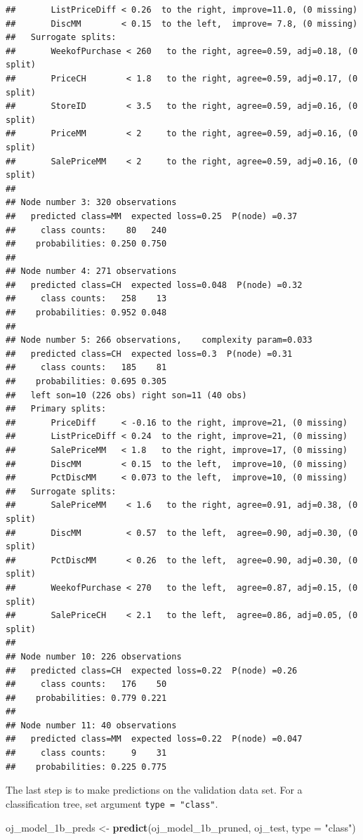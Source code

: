 \documentclass[
]{book}
\newenvironment{Shaded}{\begin{snugshade}}{\end{snugshade}}
\newcommand{\DataTypeTok}[1]{\textcolor[rgb]{0.13,0.29,0.53}{#1}}
\newcommand{\KeywordTok}[1]{\textcolor[rgb]{0.13,0.29,0.53}{\textbf{#1}}}
\newcommand{\NormalTok}[1]{#1}
\newcommand{\StringTok}[1]{\textcolor[rgb]{0.31,0.60,0.02}{#1}}
\begin{document}
\begin{verbatim}
##       ListPriceDiff < 0.26  to the right, improve=11.0, (0 missing)
##       DiscMM        < 0.15  to the left,  improve= 7.8, (0 missing)
##   Surrogate splits:
##       WeekofPurchase < 260   to the right, agree=0.59, adj=0.18, (0 split)
##       PriceCH        < 1.8   to the right, agree=0.59, adj=0.17, (0 split)
##       StoreID        < 3.5   to the right, agree=0.59, adj=0.16, (0 split)
##       PriceMM        < 2     to the right, agree=0.59, adj=0.16, (0 split)
##       SalePriceMM    < 2     to the right, agree=0.59, adj=0.16, (0 split)
## 
## Node number 3: 320 observations
##   predicted class=MM  expected loss=0.25  P(node) =0.37
##     class counts:    80   240
##    probabilities: 0.250 0.750 
## 
## Node number 4: 271 observations
##   predicted class=CH  expected loss=0.048  P(node) =0.32
##     class counts:   258    13
##    probabilities: 0.952 0.048 
## 
## Node number 5: 266 observations,    complexity param=0.033
##   predicted class=CH  expected loss=0.3  P(node) =0.31
##     class counts:   185    81
##    probabilities: 0.695 0.305 
##   left son=10 (226 obs) right son=11 (40 obs)
##   Primary splits:
##       PriceDiff     < -0.16 to the right, improve=21, (0 missing)
##       ListPriceDiff < 0.24  to the right, improve=21, (0 missing)
##       SalePriceMM   < 1.8   to the right, improve=17, (0 missing)
##       DiscMM        < 0.15  to the left,  improve=10, (0 missing)
##       PctDiscMM     < 0.073 to the left,  improve=10, (0 missing)
##   Surrogate splits:
##       SalePriceMM    < 1.6   to the right, agree=0.91, adj=0.38, (0 split)
##       DiscMM         < 0.57  to the left,  agree=0.90, adj=0.30, (0 split)
##       PctDiscMM      < 0.26  to the left,  agree=0.90, adj=0.30, (0 split)
##       WeekofPurchase < 270   to the left,  agree=0.87, adj=0.15, (0 split)
##       SalePriceCH    < 2.1   to the left,  agree=0.86, adj=0.05, (0 split)
## 
## Node number 10: 226 observations
##   predicted class=CH  expected loss=0.22  P(node) =0.26
##     class counts:   176    50
##    probabilities: 0.779 0.221 
## 
## Node number 11: 40 observations
##   predicted class=MM  expected loss=0.22  P(node) =0.047
##     class counts:     9    31
##    probabilities: 0.225 0.775
\end{verbatim}

The last step is to make predictions on the validation data set. For a classification tree, set argument \texttt{type\ =\ "class"}.

\begin{Shaded}
\begin{Highlighting}[]
\NormalTok{oj_model_1b_preds <-}\StringTok{ }\KeywordTok{predict}\NormalTok{(oj_model_1b_pruned, oj_test, }\DataTypeTok{type =} \StringTok{"class"}\NormalTok{)}
\end{Highlighting}
\end{Shaded}
\end{document}
